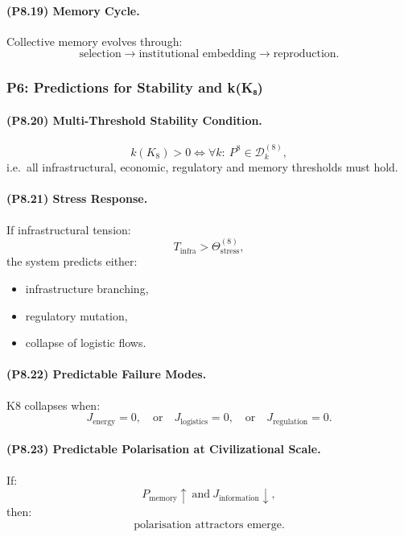 \paragraph{(P8.19) Memory Cycle.}
Collective memory evolves through:
\[
\text{selection} 
\to \text{institutional embedding} 
\to \text{reproduction}.
\]

\subsubsection{P6: Predictions for Stability and k(K₈)}

\paragraph{(P8.20) Multi-Threshold Stability Condition.}
\[
k(K_8) > 0 
\iff 
\forall k: \ P^8 \in \mathcal{D}_k^{(8)},
\]
i.e.\ all infrastructural, economic, regulatory and memory thresholds must hold.

\paragraph{(P8.21) Stress Response.}
If infrastructural tension:
\[
T_{\mathrm{infra}} > \Theta_{\mathrm{stress}}^{(8)},
\]
the system predicts either:
\begin{itemize}
    \item infrastructure branching,
    \item regulatory mutation,
    \item collapse of logistic flows.
\end{itemize}

\paragraph{(P8.22) Predictable Failure Modes.}
K8 collapses when:
\[
J_{\mathrm{energy}} = 0,
\quad \text{or} \quad
J_{\mathrm{logistics}} = 0,
\quad \text{or} \quad
J_{\mathrm{regulation}} = 0.
\]

\paragraph{(P8.23) Predictable Polarisation at Civilizational Scale.}
If:
\[
P_{\mathrm{memory}} \uparrow \ \text{and} \ 
J_{\mathrm{information}} \downarrow,
\]
then:
\[
\text{polarisation attractors emerge}.
\]

